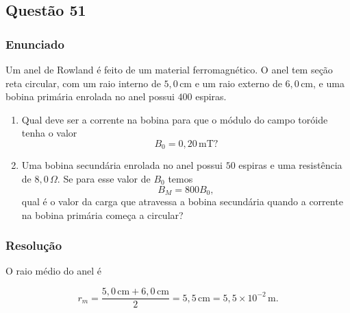 \subsection{Questão 51}

\subsubsection{Enunciado}

Um anel de Rowland é feito de um material ferromagnético. O anel tem seção reta circular, com um raio interno de \(5{,}0\,\text{cm}\) e um raio externo de \(6{,}0\,\text{cm}\), e uma bobina primária enrolada no anel possui \(400\) espiras.

\begin{enumerate}
    \item[(a)] Qual deve ser a corrente na bobina para que o módulo do campo toróide tenha o valor
    \[
    B_0 = 0{,}20\,\text{mT}?
    \]

    \item[(b)] Uma bobina secundária enrolada no anel possui \(50\) espiras e uma resistência de \(8{,}0\,\Omega\). Se para esse valor de \(B_0\) temos
    \[
    B_M = 800B_0,
    \]
    qual é o valor da carga que atravessa a bobina secundária quando a corrente na bobina primária começa a circular?
\end{enumerate}


\subsubsection{Resolução}

O raio médio do anel é

\[
r_m=\frac{5{,}0\,\text{cm}+6{,}0\,\text{cm}}{2}
=5{,}5\,\text{cm}
=5{,}5\times 10^{-2}\,\text{m}.
\]

